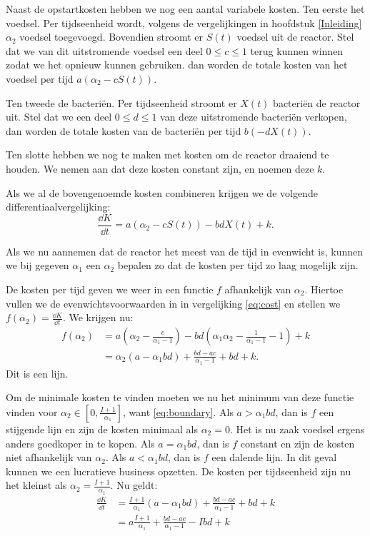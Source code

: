 Naast de opstartkosten hebben we nog een aantal variabele kosten. Ten eerste het voedsel. Per tijdseenheid wordt, volgens de vergelijkingen in hoofdstuk \ref{Inleiding} $\alpha_2$ voedsel toegevoegd. Bovendien stroomt er $S(t)$ voedsel uit de reactor. Stel dat we van dit uitstromende voedsel een deel $0\leq c\leq1$ terug kunnen winnen zodat we het opnieuw kunnen gebruiken. dan worden de totale kosten van het voedsel per tijd $a(\alpha_2-cS(t))$. 

Ten tweede de bacteri\"en. Per tijdseenheid stroomt er $X(t)$ bacteri\"en de reactor uit. Stel dat we een deel $0\leq d\leq1$ van deze uitstromende bacteri\"en verkopen, dan worden de totale kosten van de bacteri\"en per tijd $b(-dX(t))$.

Ten slotte hebben we nog te maken met kosten om de reactor draaiend te houden. We nemen aan dat deze kosten constant zijn, en noemen deze $k$.

Als we al de bovengenoemde kosten combineren krijgen we de volgende differentiaalvergelijking:
\begin{equation}
\frac{\dd K}{\dd t} = a(\alpha_2 - cS(t)) - bdX(t) + k. \label{eq:cost}
\end{equation}

Als we nu aannemen dat de reactor het meest van de tijd in evenwicht is, kunnen we bij gegeven $\alpha_1$ een $\alpha_2$ bepalen zo dat de kosten per tijd zo laag mogelijk zijn.

De kosten per tijd geven we weer in een functie $f$ afhankelijk van $\alpha_2$. Hiertoe vullen we de evenwichtsvoorwaarden in in vergelijking \ref{eq:cost} en stellen we $f(\alpha_2) = \frac{\dd K}{\dd t}$. We krijgen nu:
\begin{align*}
f(\alpha_2)
&=a(\alpha_2 - \frac{c}{\alpha_1-1}) - bd(\alpha_1\alpha_2-\frac{1}{\alpha_1-1}-1) + k\\
&=\alpha_2(a-\alpha_1bd) + \frac{bd-ac}{\alpha_1-1}+bd+k.
\end{align*}
Dit is een lijn.

Om de minimale kosten te vinden moeten we nu het minimum van deze functie vinden voor $\alpha_2\in[0, \frac{I + 1}{\alpha_1}]$, want \ref{eq:boundary}. Als $a > \alpha_1bd$, dan is $f$ een stijgende lijn en zijn de kosten minimaal als $\alpha_2 = 0$. Het is nu zaak voedsel ergens anders goedkoper in te kopen. Als $a = \alpha_1bd$, dan is $f$ constant en zijn de kosten niet afhankelijk van $\alpha_2$. Als $a < \alpha_1bd$, dan is $f$ een dalende lijn. In dit geval kunnen we een lucratieve business opzetten. De kosten per tijdseenheid zijn nu het kleinst als $\alpha_2 = \frac{I+1}{\alpha_1}$. Nu geldt:
\begin{align*}
\frac{\dd K}{\dd t}
&=\frac{I+1}{\alpha_1}(a-\alpha_1bd) + \frac{bd-ac}{\alpha_1-1}+bd+k\\
&=a\frac{I+1}{\alpha_1} + \frac{bd-ac}{\alpha_1-1} - Ibd + k
\end{align*}

